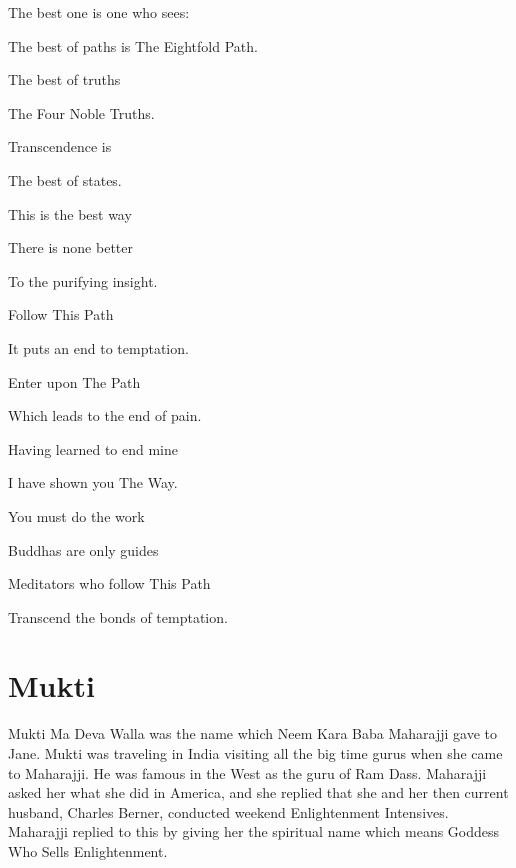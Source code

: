 \documentclass[a5paper,10pt,english]{book}
\begin{document}
\begin{DUlineblock}{0em}
\item[] 
\item[] The best one is one who sees:
\item[] The best of paths is The Eightfold Path.
\item[] The best of truths
\item[] The Four Noble Truths.
\item[] Transcendence is
\item[] The best of states.
\end{DUlineblock}

\begin{DUlineblock}{0em}
\item[] 
\item[] This is the best way
\item[] There is none better
\item[] To the purifying insight.
\item[] Follow This Path
\item[] It puts an end to temptation.
\end{DUlineblock}

\begin{DUlineblock}{0em}
\item[] 
\item[] Enter upon The Path
\item[] Which leads to the end of pain.
\item[] Having learned to end mine
\item[] I have shown you The Way.
\end{DUlineblock}

\begin{DUlineblock}{0em}
\item[] 
\item[] You must do the work
\item[] Buddhas are only guides
\item[] Meditators who follow This Path
\item[] Transcend the bonds of temptation.
\end{DUlineblock}


\section{Mukti}
\label{\detokenize{psychopaths:mukti}}
\sphinxAtStartPar
Mukti Ma Deva Walla was the name which Neem Kara Baba Maharajji gave to
Jane. Mukti was traveling in India visiting all the big time gurus when
she came to Maharajji. He was famous in the West as the guru of Ram
Dass. Maharajji asked her what she did in America, and she replied that
she and her then current husband, Charles Berner, conducted weekend
Enlightenment Intensives. Maharajji replied to this by giving her the
spiritual name which means Goddess Who Sells Enlightenment.
\end{document}
